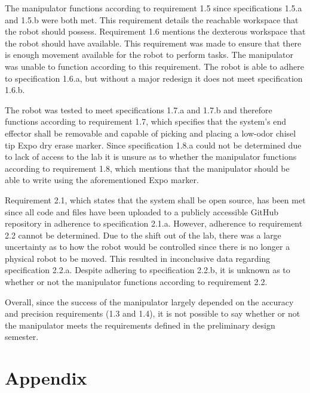 The manipulator functions according to requirement 1.5 since specifications 1.5.a and 1.5.b were both met. This requirement details the reachable workspace that the robot should possess. Requirement 1.6 mentions the dexterous workspace that the robot should have available. This requirement was made to ensure that there is enough movement available for the robot to perform tasks. The manipulator was unable to function according to this requirement. The robot is able to adhere to specification 1.6.a, but without a major redesign it does not meet specification 1.6.b.

The robot was tested to meet specifications 1.7.a and 1.7.b and therefore functions according to requirement 1.7, which specifies that the system’s end effector shall be removable and capable of picking and placing a low-odor chisel tip Expo dry erase marker. Since specification 1.8.a could not be determined due to lack of access to the lab it is unsure as to whether the manipulator functions according to requirement 1.8, which mentions that the manipulator should be able to write using the aforementioned Expo marker.

Requirement 2.1, which states that the system shall be open source, has been met since all code and files have been uploaded to a publicly accessible GitHub repository in adherence to specification 2.1.a. However, adherence to requirement 2.2 cannot be determined. Due to the shift out of the lab, there was a large uncertainty as to how the robot would be controlled since there is no longer a physical robot to be moved. This resulted in inconclusive data regarding specification 2.2.a. Despite adhering to specification 2.2.b,  it is unknown as to whether or not the manipulator functions according to requirement 2.2.

Overall, since the success of the manipulator largely depended on the accuracy and precision requirements (1.3 and 1.4), it is not possible to say whether or not the manipulator meets the requirements defined in the preliminary design semester.



\nocite{*}
\titlespacing*{\chapter}{0pt}{-10pt}{40pt} 
\null\newpage\null\newpage
% 
\appendix
\renewcommand\thesection{\Roman{section}}
\renewcommand\thesubsection{\roman{subsection}}
\section*{Appendix}\label{sec:app}


